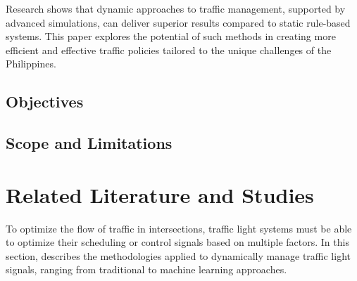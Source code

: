 Research shows that dynamic approaches to traffic management, supported by advanced simulations, can deliver superior results compared to static rule-based systems. This paper explores the potential of such methods in creating more efficient and effective traffic policies tailored to the unique challenges of the Philippines.

\subsection{Objectives}
\subsection{Scope and Limitations}

\section{Related Literature and Studies}
To optimize the flow of traffic in intersections, traffic light systems must be able to optimize their scheduling or control signals based on multiple factors. In this section, describes the methodologies applied to dynamically manage traffic light signals, ranging from traditional to machine learning approaches.



